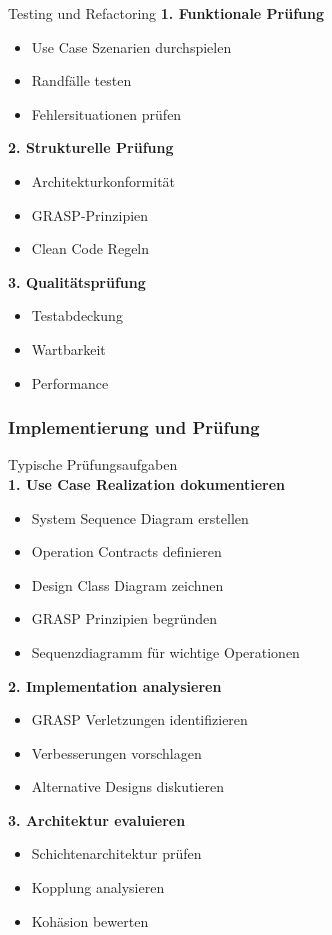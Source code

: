 \begin{KR}{Testing und Refactoring}
\textbf{1. Funktionale Prüfung}
\begin{itemize}
    \item Use Case Szenarien durchspielen
    \item Randfälle testen
    \item Fehlersituationen prüfen
\end{itemize}

\textbf{2. Strukturelle Prüfung}
\begin{itemize}
    \item Architekturkonformität
    \item GRASP-Prinzipien
    \item Clean Code Regeln
\end{itemize}

\textbf{3. Qualitätsprüfung}
\begin{itemize}
    \item Testabdeckung
    \item Wartbarkeit
    \item Performance
\end{itemize}
\end{KR}

\subsubsection{Implementierung und Prüfung}

\begin{KR}{Typische Prüfungsaufgaben}\\
\textbf{1. Use Case Realization dokumentieren}
\begin{itemize}
    \item System Sequence Diagram erstellen
    \item Operation Contracts definieren
    \item Design Class Diagram zeichnen
    \item GRASP Prinzipien begründen
    \item Sequenzdiagramm für wichtige Operationen
\end{itemize}

\textbf{2. Implementation analysieren}
\begin{itemize}
    \item GRASP Verletzungen identifizieren
    \item Verbesserungen vorschlagen
    \item Alternative Designs diskutieren
\end{itemize}

\textbf{3. Architektur evaluieren}
\begin{itemize}
    \item Schichtenarchitektur prüfen
    \item Kopplung analysieren
    \item Kohäsion bewerten
\end{itemize}
\end{KR}




